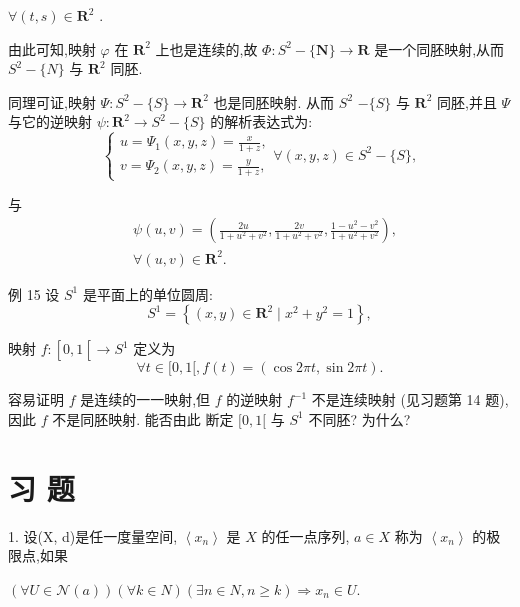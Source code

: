 $\forall \left( {t,s}\right)  \in  {\mathbf{R}}^{2}$ .

由此可知,映射 $\varphi$ 在 ${\mathbf{R}}^{2}$ 上也是连续的,故 $\Phi  : {S}^{2} - \{ \mathbf{N}\}  \rightarrow  \mathbf{R}$ 是一个同胚映射,从而 ${S}^{2} - \{ N\}$ 与 ${\mathbf{R}}^{2}$ 同胚.

同理可证,映射 $\Psi  : {S}^{2} - \{ S\}  \rightarrow  {\mathbf{R}}^{2}$ 也是同胚映射. 从而 ${S}^{2}$  $- \{ S\}$ 与 ${\mathbf{R}}^{2}$ 同胚,并且 $\Psi$ 与它的逆映射 $\psi  : {\mathbf{R}}^{2} \rightarrow  {S}^{2} - \{ S\}$ 的解析表达式为:
$$\left\{  {\begin{array}{l} u = {\Psi }_{1}\left( {x,y,z}\right)  = \frac{x}{1 + z}, \\  v = {\Psi }_{2}\left( {x,y,z}\right)  = \frac{y}{1 + z}, \end{array}\forall \left( {x,y,z}\right)  \in  {S}^{2}-\{ S\} ,}\right.$$

与
\begin{align*}
	&\psi \left( {u,v}\right)  = \left( {\frac{2u}{1 + {u}^{2} + {v}^{2}},\frac{2v}{1 + {u}^{2} + {v}^{2}},\frac{1 - {u}^{2} - {v}^{2}}{1 + {u}^{2} + {v}^{2}}}\right) ,\\
	&\forall \left( {u,v}\right)  \in  {\mathbf{R}}^{2}.
\end{align*}

例 15 设 ${S}^{1}$ 是平面上的单位圆周:
$${S}^{1} = \left\{  {\left( {x,y}\right)  \in  {\mathbf{R}}^{2} \mid  {x}^{2} + {y}^{2} = 1}\right\}  ,$$

映射 $f : \left\lbrack  {0,1\left\lbrack  { \rightarrow  {S}^{1}}\right. }\right.$ 定义为
$$\forall t \in  \lbrack 0,1\lbrack ,f\left( t\right)  = \left( {\cos {2\pi t},\sin {2\pi t}}\right) .$$

容易证明 $f$ 是连续的一一映射,但 $f$ 的逆映射 ${f}^{-1}$ 不是连续映射 (见习题第 14 题),因此 $f$ 不是同胚映射. 能否由此 断定 $\lbrack 0,1\lbrack$ 与 ${S}^{1}$ 不同胚? 为什么?

\section*{习 题}

1. 设(X, d)是任一度量空间, $\left\langle  {x}_{n}\right\rangle$ 是 $X$ 的任一点序列, $a \in  X$ 称为 $\left\langle  {x}_{n}\right\rangle$ 的极限点,如果

$\left( {\forall U \in  \mathcal{N}\left( a\right) }\right) \left( {\forall k \in  N}\right) \left( {\exists n \in  N,n \geq  k}\right)  \Rightarrow  {x}_{n} \in  U.$

